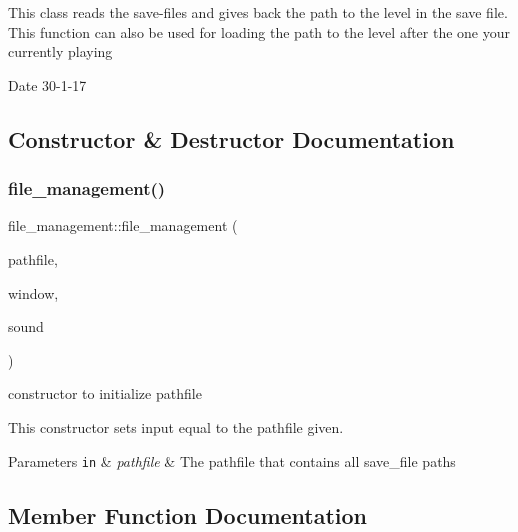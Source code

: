 This class reads the save-\/files and gives back the path to the level in the save file. This function can also be used for loading the path to the level after the one your currently playing

\begin{DoxyDate}{Date}
30-\/1-\/17 
\end{DoxyDate}


\subsection{Constructor \& Destructor Documentation}
\mbox{\label{classfile__management_a1c9de5c140a469a9d0f82970929f4a83}} 
\subsubsection{\texorpdfstring{file\+\_\+management()}{file\_management()}}
{\footnotesize\ttfamily file\+\_\+management\+::file\+\_\+management (\begin{DoxyParamCaption}\item[{std\+::string}]{pathfile,  }\item[{sf\+::\+Render\+Window \&}]{window,  }\item[{\hyperlink{classsoundtrack}{soundtrack} \&}]{sound }\end{DoxyParamCaption})}



constructor to initialize pathfile 

This constructor sets input equal to the pathfile given.


\begin{DoxyParams}[1]{Parameters}
\mbox{\tt in}  & {\em pathfile} & The pathfile that contains all save\+\_\+file paths \\
\hline
\end{DoxyParams}


\subsection{Member Function Documentation}
\mbox{\label{classfile__management_ae6291547fab57a5b861c52e970175854}} 
